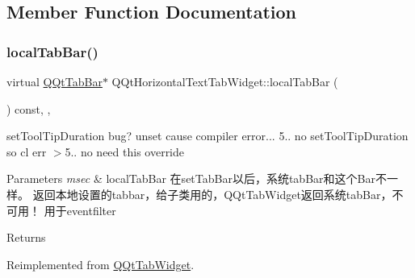 \subsection{Member Function Documentation}
\mbox{\label{class_q_qt_horizontal_text_tab_widget_a212f673045037d360d73d534ebf7ced1}} 
\subsubsection{\texorpdfstring{local\+Tab\+Bar()}{localTabBar()}}
{\footnotesize\ttfamily virtual \mbox{\hyperlink{class_q_qt_tab_bar}{Q\+Qt\+Tab\+Bar}}$\ast$ Q\+Qt\+Horizontal\+Text\+Tab\+Widget\+::local\+Tab\+Bar (\begin{DoxyParamCaption}{ }\end{DoxyParamCaption}) const\hspace{0.3cm}{\ttfamily [inline]}, {\ttfamily [override]}, {\ttfamily [virtual]}}



set\+Tool\+Tip\+Duration bug? unset cause compiler error... 5.. no set\+Tool\+Tip\+Duration so cl err $>$5.. no need this override 


\begin{DoxyParams}{Parameters}
{\em msec} & local\+Tab\+Bar 在set\+Tab\+Bar以后，系统tab\+Bar和这个\+Bar不一样。 返回本地设置的tabbar，给子类用的，\+Q\+Qt\+Tab\+Widget返回系统tab\+Bar，不可用！ 用于eventfilter \\
\hline
\end{DoxyParams}
\begin{DoxyReturn}{Returns}

\end{DoxyReturn}


Reimplemented from \mbox{\hyperlink{class_q_qt_tab_widget_a53183c40775ba6e7142f429edfd75d9c}{Q\+Qt\+Tab\+Widget}}.

\mbox{\label{class_q_qt_horizontal_text_tab_widget_a788d91acd924a0eceafcb0fa95c91ffe}} 
